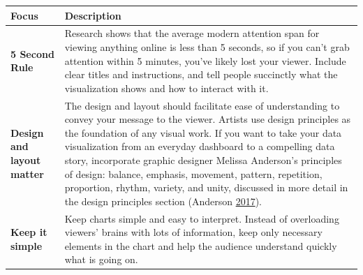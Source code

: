 \documentclass[]{book}
\theoremstyle{definition}
\theoremstyle{definition}
\theoremstyle{definition}
\theoremstyle{remark}
\begin{document}
\begin{longtable}[]{@{}ll@{}}
\toprule
\begin{minipage}[b]{0.19\columnwidth}\raggedright\strut
\textbf{Focus}\strut
\end{minipage} & \begin{minipage}[b]{0.75\columnwidth}\raggedright\strut
\textbf{Description}\strut
\end{minipage}\tabularnewline
\midrule
\endhead
\begin{minipage}[t]{0.19\columnwidth}\raggedright\strut
\textbf{5 Second Rule}\strut
\end{minipage} & \begin{minipage}[t]{0.75\columnwidth}\raggedright\strut
Research shows that the average modern attention span for viewing
anything online is less than 5 seconds, so if you can't grab attention
within 5 minutes, you've likely lost your viewer. Include clear titles
and instructions, and tell people succinctly what the visualization
shows and how to interact with it.\strut
\end{minipage}\tabularnewline
\begin{minipage}[t]{0.19\columnwidth}\raggedright\strut
\textbf{Design and layout matter}\strut
\end{minipage} & \begin{minipage}[t]{0.75\columnwidth}\raggedright\strut
The design and layout should facilitate ease of understanding to convey
your message to the viewer. Artists use design principles as the
foundation of any visual work. If you want to take your data
visualization from an everyday dashboard to a compelling data story,
incorporate graphic designer Melissa Anderson's principles of design:
balance, emphasis, movement, pattern, repetition, proportion, rhythm,
variety, and unity, discussed in more detail in the design principles
section (Anderson
\protect\hyperlink{ref-design_principles}{2017}).\strut
\end{minipage}\tabularnewline
\begin{minipage}[t]{0.19\columnwidth}\raggedright\strut
\textbf{Keep it simple}\strut
\end{minipage} & \begin{minipage}[t]{0.75\columnwidth}\raggedright\strut
Keep charts simple and easy to interpret. Instead of overloading
viewers' brains with lots of information, keep only necessary elements
in the chart and help the audience understand quickly what is going
on.\strut
\end{minipage}\tabularnewline

\end{longtable}
\end{document}
